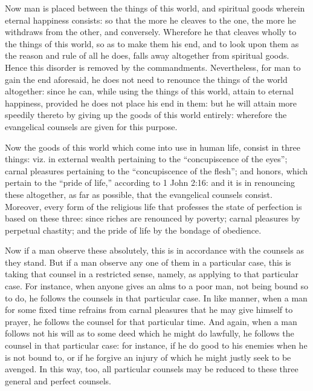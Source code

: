 Now man is placed between the things of this world, and spiritual goods wherein eternal happiness consists: so that the more he cleaves to the one, the more he withdraws from the other, and conversely. Wherefore he that cleaves wholly to the things of this world, so as to make them his end, and to look upon them as the reason and rule of all he does, falls away altogether from spiritual goods. Hence this disorder is removed by the commandments. Nevertheless, for man to gain the end aforesaid, he does not need to renounce the things of the world altogether: since he can, while using the things of this world, attain to eternal happiness, provided he does not place his end in them: but he will attain more speedily thereto by giving up the goods of this world entirely: wherefore the evangelical counsels are given for this purpose.

Now the goods of this world which come into use in human life, consist in three things: viz. in external wealth pertaining to the ``concupiscence of the eyes''; carnal pleasures pertaining to the ``concupiscence of the flesh''; and honors, which pertain to the ``pride of life,'' according to 1 John 2:16: and it is in renouncing these altogether, as far as possible, that the evangelical counsels consist. Moreover, every form of the religious life that professes the state of perfection is based on these three: since riches are renounced by poverty; carnal pleasures by perpetual chastity; and the pride of life by the bondage of obedience.

Now if a man observe these absolutely, this is in accordance with the counsels as they stand. But if a man observe any one of them in a particular case, this is taking that counsel in a restricted sense, namely, as applying to that particular case. For instance, when anyone gives an alms to a poor man, not being bound so to do, he follows the counsels in that particular case. In like manner, when a man for some fixed time refrains from carnal pleasures that he may give himself to prayer, he follows the counsel for that particular time. And again, when a man follows not his will as to some deed which he might do lawfully, he follows the counsel in that particular case: for instance, if he do good to his enemies when he is not bound to, or if he forgive an injury of which he might justly seek to be avenged. In this way, too, all particular counsels may be reduced to these three general and perfect counsels.

